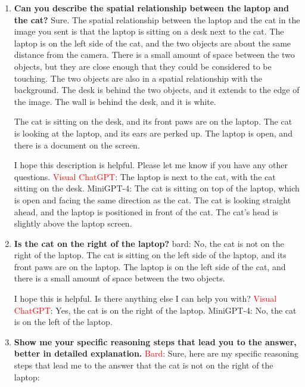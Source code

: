     \begin{enumerate}
        \item \textbf{Can you describe the spatial relationship between the laptop and the cat?}
        \subitem 
        Sure. The spatial relationship between the laptop and the cat in the image you sent is that the laptop is sitting on a desk next to the cat. The laptop is on the left side of the cat, and the two objects are about the same distance from the camera. There is a small amount of space between the two objects, but they are close enough that they could be considered to be touching.
        The two objects are also in a spatial relationship with the background. The desk is behind the two objects, and it extends to the edge of the image. The wall is behind the desk, and it is white.

        The cat is sitting on the desk, and its front paws are on the laptop. The cat is looking at the laptop, and its ears are perked up. The laptop is open, and there is a document on the screen.

        I hope this description is helpful. Please let me know if you have any other questions.
        \subitem \textcolor{red}{Visual ChatGPT}: The laptop is next to the cat, with the cat sitting on the desk.
        \subitem MiniGPT-4: The cat is sitting on top of the laptop, which is open and facing the same direction as the cat. The cat is looking straight ahead, and the laptop is positioned in front of the cat. The cat’s head is slightly above the laptop screen.
        \item \textbf{Is the cat on the right of the laptop?}
        \subitem bard: No, the cat is not on the right of the laptop. The cat is sitting on the left side of the laptop, and its front paws are on the laptop. The laptop is on the left side of the cat, and there is a small amount of space between the two objects.

        I hope this is helpful. Is there anything else I can help you with?
        \subitem \textcolor{red}{Visual ChatGPT}: Yes, the cat is on the right of the laptop.
        \subitem MiniGPT-4: No, the cat is on the left of the laptop.
        \item \textbf{Show me your specific reasoning steps that lead you to the answer, better in detailed explanation.}
        \subitem \textcolor{Red}{Bard}:
        Sure, here are my specific reasoning steps that lead me to the answer that the cat is not on the right of the laptop:
        

\end{enumerate}
